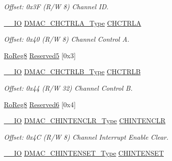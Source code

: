 \begin{DoxyCompactItemize}
\begin{DoxyCompactList}\small\item\em Offset\+: 0x3F (R/W 8) Channel ID. \end{DoxyCompactList}\item 
\mbox{\hyperlink{core__cm0plus_8h_aec43007d9998a0a0e01faede4133d6be}{\+\_\+\+\_\+\+IO}} \mbox{\hyperlink{union_d_m_a_c___c_h_c_t_r_l_a___type}{D\+M\+A\+C\+\_\+\+C\+H\+C\+T\+R\+L\+A\+\_\+\+Type}} \mbox{\hyperlink{struct_dmac_a67ecb1bfb5647ab51566b780cc945203}{C\+H\+C\+T\+R\+LA}}
\begin{DoxyCompactList}\small\item\em Offset\+: 0x40 (R/W 8) Channel Control A. \end{DoxyCompactList}\item 
\mbox{\hyperlink{group___s_a_m_d21_e15_a__definitions_ga0d957f1433aaf5d70e4dc2b68288442d}{Ro\+Reg8}} \mbox{\hyperlink{struct_dmac_a033695717f8be7f53c1fb9bf2601212b}{Reserved5}} \mbox{[}0x3\mbox{]}
\item 
\mbox{\hyperlink{core__cm0plus_8h_aec43007d9998a0a0e01faede4133d6be}{\+\_\+\+\_\+\+IO}} \mbox{\hyperlink{union_d_m_a_c___c_h_c_t_r_l_b___type}{D\+M\+A\+C\+\_\+\+C\+H\+C\+T\+R\+L\+B\+\_\+\+Type}} \mbox{\hyperlink{struct_dmac_a016e66155d79c414f5deb16a30e5caeb}{C\+H\+C\+T\+R\+LB}}
\begin{DoxyCompactList}\small\item\em Offset\+: 0x44 (R/W 32) Channel Control B. \end{DoxyCompactList}\item 
\mbox{\hyperlink{group___s_a_m_d21_e15_a__definitions_ga0d957f1433aaf5d70e4dc2b68288442d}{Ro\+Reg8}} \mbox{\hyperlink{struct_dmac_a90ebeceec1a70581f0fc4da2e250e4a6}{Reserved6}} \mbox{[}0x4\mbox{]}
\item 
\mbox{\hyperlink{core__cm0plus_8h_aec43007d9998a0a0e01faede4133d6be}{\+\_\+\+\_\+\+IO}} \mbox{\hyperlink{union_d_m_a_c___c_h_i_n_t_e_n_c_l_r___type}{D\+M\+A\+C\+\_\+\+C\+H\+I\+N\+T\+E\+N\+C\+L\+R\+\_\+\+Type}} \mbox{\hyperlink{struct_dmac_a162ee7b98e87fe47dbb2dbcf5312b08b}{C\+H\+I\+N\+T\+E\+N\+C\+LR}}
\begin{DoxyCompactList}\small\item\em Offset\+: 0x4C (R/W 8) Channel Interrupt Enable Clear. \end{DoxyCompactList}\item 
\mbox{\hyperlink{core__cm0plus_8h_aec43007d9998a0a0e01faede4133d6be}{\+\_\+\+\_\+\+IO}} \mbox{\hyperlink{union_d_m_a_c___c_h_i_n_t_e_n_s_e_t___type}{D\+M\+A\+C\+\_\+\+C\+H\+I\+N\+T\+E\+N\+S\+E\+T\+\_\+\+Type}} \mbox{\hyperlink{struct_dmac_a47abea7e3b538e7a0598831c2bbcb399}{C\+H\+I\+N\+T\+E\+N\+S\+ET}}

\end{DoxyCompactItemize}
